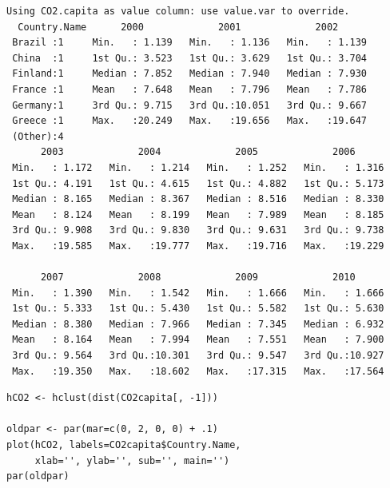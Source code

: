 \begin{verbatim}
Using CO2.capita as value column: use value.var to override.
  Country.Name      2000             2001             2002       
 Brazil :1     Min.   : 1.139   Min.   : 1.136   Min.   : 1.139  
 China  :1     1st Qu.: 3.523   1st Qu.: 3.629   1st Qu.: 3.704  
 Finland:1     Median : 7.852   Median : 7.940   Median : 7.930  
 France :1     Mean   : 7.648   Mean   : 7.796   Mean   : 7.786  
 Germany:1     3rd Qu.: 9.715   3rd Qu.:10.051   3rd Qu.: 9.667  
 Greece :1     Max.   :20.249   Max.   :19.656   Max.   :19.647  
 (Other):4                                                       
      2003             2004             2005             2006       
 Min.   : 1.172   Min.   : 1.214   Min.   : 1.252   Min.   : 1.316  
 1st Qu.: 4.191   1st Qu.: 4.615   1st Qu.: 4.882   1st Qu.: 5.173  
 Median : 8.165   Median : 8.367   Median : 8.516   Median : 8.330  
 Mean   : 8.124   Mean   : 8.199   Mean   : 7.989   Mean   : 8.185  
 3rd Qu.: 9.908   3rd Qu.: 9.830   3rd Qu.: 9.631   3rd Qu.: 9.738  
 Max.   :19.585   Max.   :19.777   Max.   :19.716   Max.   :19.229  
                                                                    
      2007             2008             2009             2010       
 Min.   : 1.390   Min.   : 1.542   Min.   : 1.666   Min.   : 1.666  
 1st Qu.: 5.333   1st Qu.: 5.430   1st Qu.: 5.582   1st Qu.: 5.630  
 Median : 8.380   Median : 7.966   Median : 7.345   Median : 6.932  
 Mean   : 8.164   Mean   : 7.994   Mean   : 7.551   Mean   : 7.900  
 3rd Qu.: 9.564   3rd Qu.:10.301   3rd Qu.: 9.547   3rd Qu.:10.927  
 Max.   :19.350   Max.   :18.602   Max.   :17.315   Max.   :17.564
\end{verbatim}


\lstset{language=r,label= ,caption= ,captionpos=b,numbers=none}
\begin{lstlisting}
hCO2 <- hclust(dist(CO2capita[, -1]))

oldpar <- par(mar=c(0, 2, 0, 0) + .1)
plot(hCO2, labels=CO2capita$Country.Name,
     xlab='', ylab='', sub='', main='')
par(oldpar)
\end{lstlisting}

